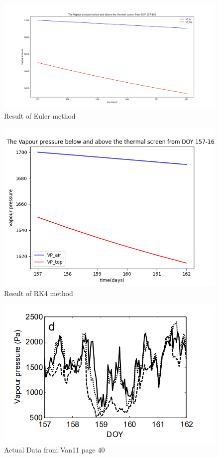 \documentclass[a4paper]{article}
\numberwithin{equation}{section}
\begin{document}
\begin{figure}[H]
  \centering
  \includegraphics[width=16cm]{VP_compare_Euler.png}
  \caption{Result of Euler method}
\end{figure}
\begin{figure}[H]
  \centering
  \includegraphics[width=12cm]{VP_compare_RK4.png}
  \caption{Result of RK4 method}
\end{figure}
\begin{figure}[H]
  \centering
  \includegraphics[width=15cm]{VP.png}
  \caption{Actual Data from Van11 page 40}
\end{figure}
\end{document}
